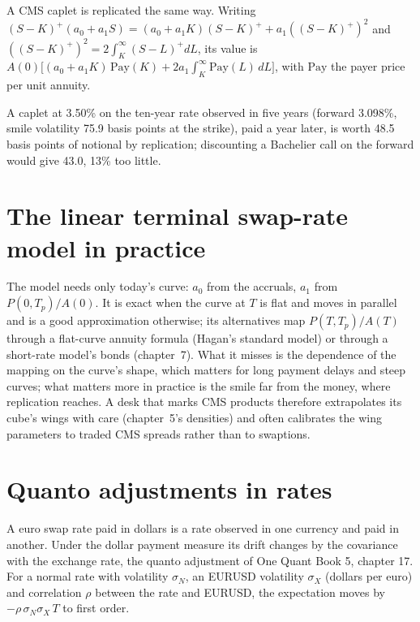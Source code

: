 A CMS caplet is replicated the same way. Writing $(S-K)^+(a_0+a_1S) =
(a_0+a_1K)(S-K)^+ + a_1((S-K)^+)^2$ and $((S-K)^+)^2 = 2\int_K^\infty(S-L)^+dL$,
its value is $A(0)\bigl[(a_0+a_1K)\,\mathrm{Pay}(K) + 2a_1\int_K^\infty
\mathrm{Pay}(L)\,dL\bigr]$, with $\mathrm{Pay}$ the payer price per unit annuity.

\label{lst:rc:convexity-adjustments-and-constant-maturity-products:caplet}

\begin{example}\label{ex:rc:convexity-adjustments-and-constant-maturity-products:caplet}
A caplet at 3.50\% on the ten-year rate observed in five years (forward
3.098\%, smile volatility 75.9 basis points at the strike), paid a year later,
is worth 48.5 basis points of notional by replication; discounting a
Bachelier call on the forward would give 43.0, 13\% too little.
\end{example}

\section{The linear terminal swap-rate model in practice}

The model needs only today's curve: $a_0$ from the accruals, $a_1$ from
$P(0,T_p)/A(0)$. It is exact when the curve at $T$ is flat and moves in parallel
and is a good approximation otherwise; its alternatives map $P(T,T_p)/A(T)$
through a flat-curve annuity formula (Hagan's standard model) or through a
short-rate model's bonds (chapter~7). What it misses is the dependence of the
mapping on the curve's shape, which matters for long payment delays and steep
curves; what matters more in practice is the smile far from the money, where
replication reaches. A desk that marks CMS products therefore extrapolates its
cube's wings with care (chapter~5's densities) and often calibrates the wing
parameters to traded CMS spreads rather than to swaptions.

\section{Quanto adjustments in rates}

A euro swap rate paid in dollars is a rate observed in one currency and paid in
another. Under the dollar payment measure its drift changes by the covariance
with the exchange rate, the quanto adjustment of One Quant Book 5, chapter 17.
For a normal rate with volatility $\sigma_N$, an EURUSD volatility $\sigma_X$
(dollars per euro) and correlation $\rho$ between the rate and EURUSD, the
expectation moves by $-\rho\,\sigma_N\sigma_X\,T$ to first order.

